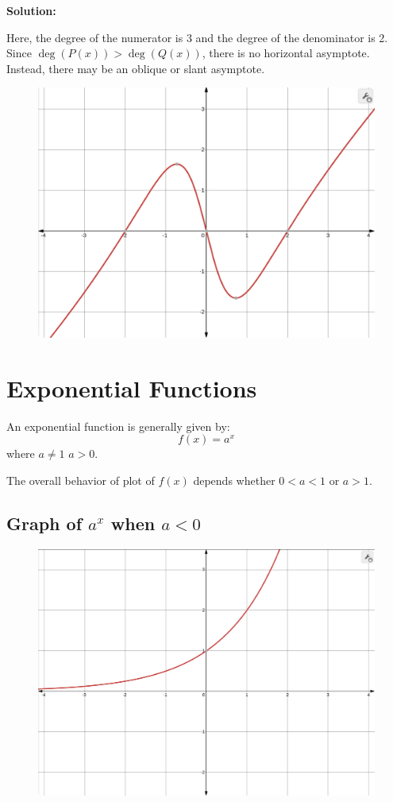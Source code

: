\textbf{Solution:}

Here, the degree of the numerator is 3 and the degree of the denominator is 2. Since \( \deg(P(x)) > \deg(Q(x)) \), there is no horizontal asymptote. Instead, there may be an oblique or slant asymptote.

\begin{figure}[H]
  \centering
  \includegraphics[scale=0.2]{"./fig/ho_asym3.png"}
\end{figure}
\section{Exponential Functions}

\begin{definition}
An exponential function is generally given by:
\[
f(x) = a^x
\]
where \( a \neq 1 \) \( a>0 \). 
\end{definition}

The overall behavior of plot of $f(x)$ depends whether $0<a<1$ or $a>1$.

\subsection*{Graph of \(a^{x}\) when \(a<0\)}
\begin{figure}[H]
  \centering
  \includegraphics[scale=0.15]{"./fig/exp_1.png"}
\end{figure}
